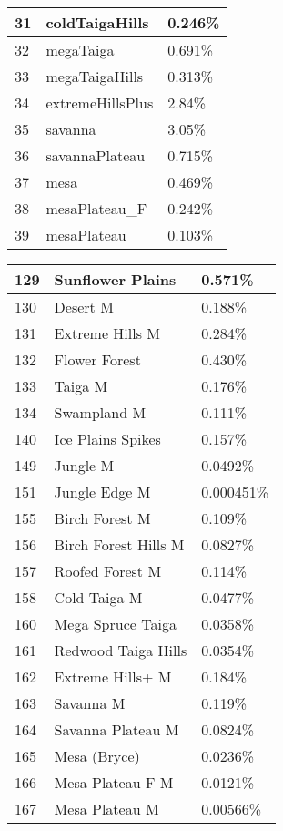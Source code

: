\documentclass{article}
\begin{document}
\begin{tabular}{|l|l|l|}
		31     & coldTaigaHills      & 0.246\%\\\hline
		32     & megaTaiga           & 0.691\%\\\hline
		33     & megaTaigaHills      & 0.313\%\\\hline
		34     & extremeHillsPlus    & 2.84\%\\\hline
		35     & savanna             & 3.05\%\\\hline
		36     & savannaPlateau      & 0.715\%\\\hline
		37     & mesa                & 0.469\%\\\hline
		38     & mesaPlateau\_F      & 0.242\%\\\hline
		39     & mesaPlateau         & 0.103\%\\\hline
	\end{tabular}
	\newpage\noindent
	\begin{tabular}{|l|l|l|}\hline
		129    & Sunflower Plains     & 0.571\%\\\hline
		130    & Desert M             & 0.188\%\\\hline
		131    & Extreme Hills M      & 0.284\%\\\hline
		132    & Flower Forest        & 0.430\%\\\hline
		133    & Taiga M              & 0.176\%\\\hline
		134    & Swampland M          & 0.111\%\\\hline
		140    & Ice Plains Spikes    & 0.157\%\\\hline
		149    & Jungle M             & 0.0492\%\\\hline
		151    & Jungle Edge M        & 0.000451\%\\\hline
		155    & Birch Forest M       & 0.109\%\\\hline
		156    & Birch Forest Hills M & 0.0827\%\\\hline
		157    & Roofed Forest M      & 0.114\%\\\hline
		158    & Cold Taiga M         & 0.0477\%\\\hline
		160    & Mega Spruce Taiga    & 0.0358\%\\\hline
		161    & Redwood Taiga Hills  & 0.0354\%\\\hline
		162    & Extreme Hills+ M     & 0.184\%\\\hline
		163    & Savanna M            & 0.119\%\\\hline
		164    & Savanna Plateau M    & 0.0824\%\\\hline
		165    & Mesa (Bryce)         & 0.0236\%\\\hline
		166    & Mesa Plateau F M     & 0.0121\%\\\hline
		167    & Mesa Plateau M       & 0.00566\%\\\hline
	\end{tabular}
	
\end{document}
